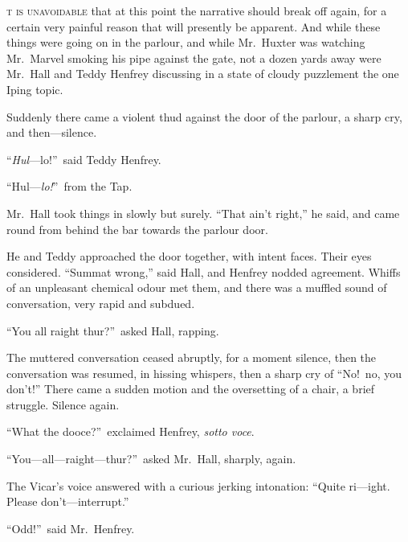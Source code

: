 \label{ch:12}
\begin{ChapterStart}
\vspace*{2\nbs}

\vspace{1.5\nbs}
\vspace{0.75\nbs}
\end{ChapterStart}

\kern-6pt\textsc{t is unavoidable} that at this point the narrative should break off again, for a certain very painful reason that will presently be apparent. And while these things were going on in the parlour, and while Mr.\ Huxter was watching Mr.\ Marvel smoking his pipe against the gate, not a dozen yards away were Mr.\ Hall and Teddy Henfrey discussing in a state of cloudy puzzlement the one Iping topic.

Suddenly there came a violent thud against the door of the parlour, a sharp cry, and then—silence.

“\emph{Hul}—lo!”\ said Teddy Henfrey.

“Hul—\emph{lo!}”\ from the Tap.

Mr.\ Hall took things in slowly but surely. “That ain’t right,” he said, and came round from behind the bar towards the parlour door.

He and Teddy approached the door together, with intent faces. Their eyes considered. “Summat wrong,” said Hall, and Henfrey nodded agreement. Whiffs of an unpleasant chemical odour met them, and there was a muffled sound of conversation, very rapid and subdued.

“You all raight thur?”\ asked Hall, rapping.

The muttered conversation ceased abruptly, for a moment silence, then the conversation was resumed, in hissing whispers, then a sharp cry of “No!\ no, you don’t!” There came a sudden motion and the oversetting of a chair, a brief struggle. Silence again.

“What the dooce?”\ exclaimed Henfrey, \emph{sotto voce}.

“You—all—raight—thur?”\ asked Mr.\ Hall, sharply, again.

The Vicar’s voice answered with a curious jerking intonation: “Quite ri—ight. Please don’t—interrupt.”

“Odd!”\ said Mr.\ Henfrey.


